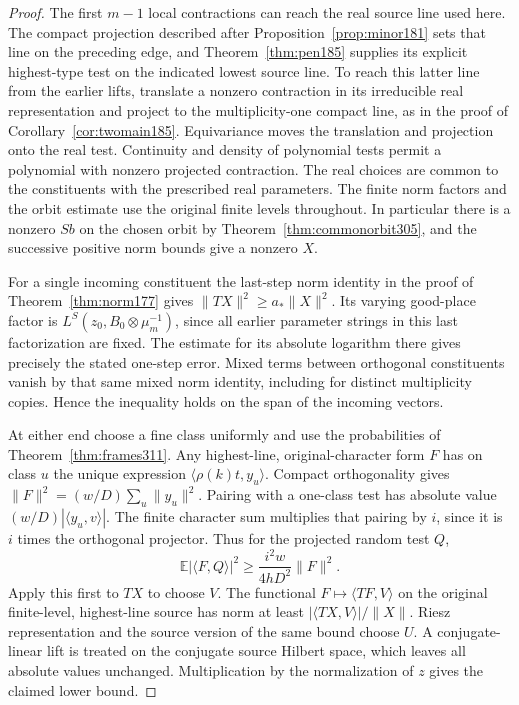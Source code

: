 \documentclass[a4paper,11pt]{article}
\theoremstyle{definition}
\theoremstyle{remark}
\numberwithin{equation}{section}
\begin{document}
\begin{proof}
The first \(m-1\) local contractions can reach the real source
line used here. The compact projection described after
Proposition~\ref{prop:minor181} sets that line on the preceding
edge, and Theorem~\ref{thm:pen185} supplies its explicit
highest-type test on the indicated lowest source line. To reach
this latter line from the earlier lifts, translate a nonzero
contraction in its irreducible real representation and project
to the multiplicity-one compact line, as in the proof of
Corollary~\ref{cor:twomain185}. Equivariance moves
the translation and projection onto the real test. Continuity
and density of polynomial tests permit a polynomial with
nonzero projected contraction. The real choices are common to
the constituents with the prescribed real parameters. The finite
norm factors and the orbit estimate use the original finite
levels throughout. In particular there is a nonzero \(Sb\) on
the chosen orbit by Theorem~\ref{thm:commonorbit305}, and the
successive positive norm bounds give a nonzero \(X\).

For a single incoming constituent the last-step norm identity
in the proof of Theorem~\ref{thm:norm177} gives
\(\|TX\|^2\ge a_*\|X\|^2\). Its varying good-place factor is
\(L^S(z_0,B_0\otimes\mu_m^{-1})\), since all earlier parameter
strings in this last factorization are fixed. The estimate
for its absolute logarithm there gives precisely the stated
one-step error. Mixed terms between orthogonal constituents
vanish by that same mixed norm identity, including for distinct
multiplicity copies. Hence the inequality holds on the span
of the incoming vectors.

At either end choose a fine class uniformly and use the
probabilities of Theorem~\ref{thm:frames311}. Any
highest-line, original-character form \(F\) has on class \(u\)
the unique expression \(\langle\rho(k)t,y_u\rangle\).
Compact orthogonality gives
\(\|F\|^2=(w/D)\sum_u\|y_u\|^2\). Pairing with a one-class
test has absolute value \((w/D)|\langle y_u,v\rangle|\).
The finite character sum multiplies that pairing by \(i\),
since it is \(i\) times the orthogonal projector. Thus for
the projected random test \(Q\),
\[
 {\mathbb E}|\langle F,Q\rangle|^2
                 \ge \frac{i^2w}{4hD^2}\|F\|^2 .
\]
Apply this first to \(TX\) to choose \(V\). The functional
\(F\mapsto\langle TF,V\rangle\) on the original finite-level,
highest-line source has norm at least
\(|\langle TX,V\rangle|/\|X\|\). Riesz representation and the
source version of the same bound choose \(U\). A conjugate-linear
lift is treated on the conjugate source Hilbert space, which
leaves all absolute values unchanged. Multiplication by the
normalization of \(z\) gives the claimed lower bound.


\end{proof}
\end{document}
